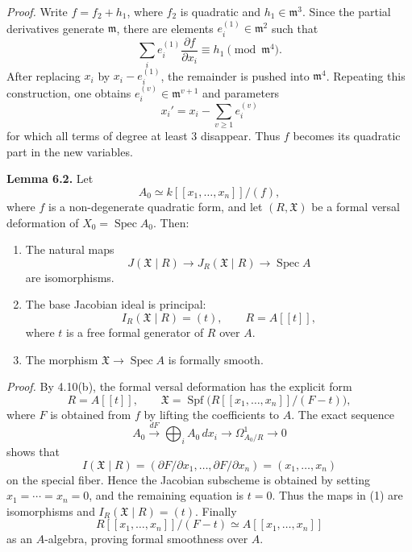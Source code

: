 \documentclass[11pt]{article}
\providecommand{\Spec}{\operatorname{Spec}}
\providecommand{\Spf}{\operatorname{Spf}}
\begin{document}
\emph{Proof.}  Write \(f=f_2+h_1\), where \(f_2\) is quadratic and \(h_1\in\mathfrak m^3\).  Since the partial derivatives generate \(\mathfrak m\), there are elements \(e_i^{(1)}\in\mathfrak m^2\) such that
\[
        \sum_i e_i^{(1)}\frac{\partial f}{\partial x_i}
        \equiv h_1\pmod{\mathfrak m^4}.
\]
After replacing \(x_i\) by \(x_i-e_i^{(1)}\), the remainder is pushed into \(\mathfrak m^4\).  Repeating this construction, one obtains \(e_i^{(v)}\in\mathfrak m^{v+1}\) and parameters
\[
        x_i' = x_i-\sum_{v\geq 1}e_i^{(v)}
\]
for which all terms of degree at least \(3\) disappear.  Thus \(f\) becomes its quadratic part in the new variables.

\textbf{Lemma 6.2.}  Let
\[
        A_0\simeq k[[x_1,\ldots,x_n]]/(f),
\]
where \(f\) is a non-degenerate quadratic form, and let \((R,\mathfrak X)\) be a formal versal deformation of \(X_0=\Spec A_0\).  Then:
\begin{enumerate}[label=(\arabic*)]
\item The natural maps
\[
        J(\mathfrak X\mid R)\longrightarrow J_R(\mathfrak X\mid R)
        \longrightarrow \Spec A
\]
are isomorphisms.
\item The base Jacobian ideal is principal:
\[
        I_R(\mathfrak X\mid R)=(t),
        \qquad
        R=A[[t]],
\]
where \(t\) is a free formal generator of \(R\) over \(A\).
\item The morphism \(\mathfrak X\to\Spec A\) is formally smooth.
\end{enumerate}

\emph{Proof.}  By 4.10(b), the formal versal deformation has the explicit form
\[
        R=A[[t]],\qquad
        \mathfrak X=
        \Spf\bigl(R[[x_1,\ldots,x_n]]/(F-t)\bigr),
\]
where \(F\) is obtained from \(f\) by lifting the coefficients to \(A\).  The exact sequence
\[
        A_0\xrightarrow{dF}
        \bigoplus_i A_0\,dx_i
        \longrightarrow
        \Omega^1_{A_0/R}
        \longrightarrow 0
\]
shows that
\[
        I(\mathfrak X\mid R)=(\partial F/\partial x_1,\ldots,\partial F/\partial x_n)
        =(x_1,\ldots,x_n)
\]
on the special fiber.  Hence the Jacobian subscheme is obtained by setting \(x_1=\cdots=x_n=0\), and the remaining equation is \(t=0\).  Thus the maps in (1) are isomorphisms and \(I_R(\mathfrak X\mid R)=(t)\).  Finally
\[
        R[[x_1,\ldots,x_n]]/(F-t)
        \simeq
        A[[x_1,\ldots,x_n]]
\]
as an \(A\)-algebra, proving formal smoothness over \(A\).
\end{document}
